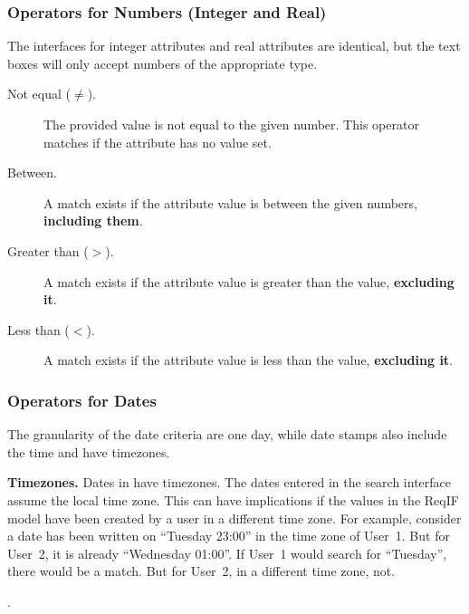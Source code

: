 \subsubsection{Operators for Numbers (Integer and Real)}

The interfaces for integer attributes and real attributes are identical, but the text boxes will only accept numbers of the appropriate type.

\begin{description}
\item[Not equal ($\neq$).] The provided value is not equal to the given number. This operator matches if the attribute has no value set.
\item[Between.] A match exists if the attribute value is between the given numbers, \textbf{including them}.
\item[Greater than ($>$).] A match exists if the attribute value is greater than the value, \textbf{excluding it}.
\item[Less than ($<$).] A match exists if the attribute value is less than the value, \textbf{excluding it}.
\end{description}

\subsubsection{Operators for Dates}

The granularity of the date criteria are one day, while \pror{} date stamps also include the time and have timezones.

\begin{warning}
\textbf{Timezones.} Dates in \pror{} have timezones.  The dates entered in the search interface assume the local time zone.  This can have implications if the values in the ReqIF model have been created by a user in a different time zone.  For example, consider a date has been written on ``Tuesday 23:00'' in the time zone of User~1.  But for User~2, it is already ``Wednesday 01:00''.  If User~1 would search for ``Tuesday'', there would be a match.  But for User~2, in a different time zone, not.
\end{warning}.

